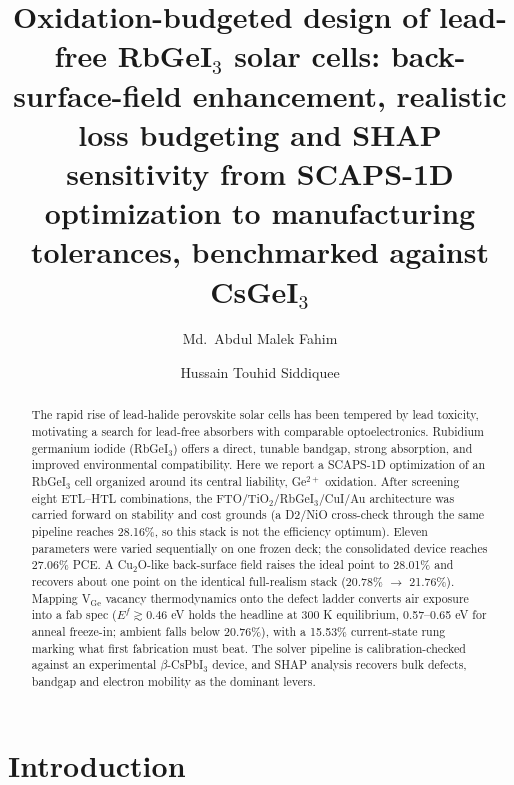 \documentclass[aip,jap,amsmath,amssymb,preprint]{revtex4-2}
\begin{document}
\title[RbGeI3 solar cells]{Oxidation-budgeted design of lead-free RbGeI$_{3}$ solar cells: back-surface-field enhancement, realistic loss budgeting and SHAP sensitivity from SCAPS-1D optimization to manufacturing tolerances, benchmarked against CsGeI$_{3}$}
\author{Md.\ Abdul Malek Fahim}
\author{Hussain Touhid Siddiquee}
\begin{abstract}
The rapid rise of lead-halide perovskite solar cells has been tempered by lead toxicity, motivating a search for lead-free absorbers with comparable optoelectronics. Rubidium germanium iodide (RbGeI$_{3}$) offers a direct, tunable bandgap, strong absorption, and improved environmental compatibility. Here we report a SCAPS-1D optimization of an RbGeI$_{3}$ cell organized around its central liability, Ge$^{2+}$ oxidation. After screening eight ETL--HTL combinations, the FTO/\allowbreak{}TiO$_{2}$/RbGeI$_{3}$/CuI/\allowbreak{}Au architecture was carried forward on stability and cost grounds (a D2/NiO cross-check through the same pipeline reaches 28.16\%, so this stack is not the efficiency optimum). Eleven parameters were varied sequentially on one frozen deck; the consolidated device reaches 27.06\% PCE. A Cu$_{2}$O-like back-surface field raises the ideal point to 28.01\% and recovers about one point on the identical full-realism stack (20.78\% $\rightarrow$ 21.76\%). Mapping V$_{\mathrm{Ge}}$ vacancy thermodynamics onto the defect ladder converts air exposure into a fab spec ($E^f\gtrsim0.46$ eV holds the headline at 300 K equilibrium, 0.57--0.65 eV for anneal freeze-in; ambient falls below 20.76\%), with a 15.53\% current-state rung marking what first fabrication must beat. The solver pipeline is calibration-checked against an experimental $\beta$-CsPbI$_{3}$ device, and SHAP analysis recovers bulk defects, bandgap and electron mobility as the dominant levers.
\end{abstract}
\maketitle
\section{Introduction}
\end{document}

